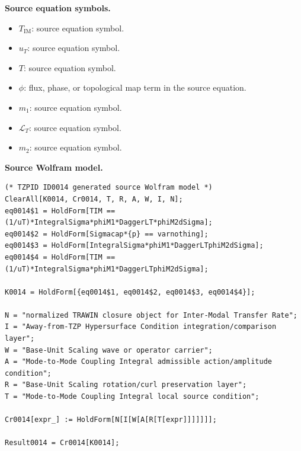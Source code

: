 \begin{minipage}[t]{0.49\linewidth}
\begingroup
\small
\raggedright
\textbf{Source equation symbols.}\par
\begin{itemize}[leftmargin=1.35em,itemsep=1pt,topsep=1pt,parsep=0pt]
    \item $T_{\mathrm{IM}}$: source equation symbol.
    \item $u_{T}$: source equation symbol.
    \item $T$: source equation symbol.
    \item $\phi$: flux, phase, or topological map term in the source equation.
    \item $m_{1}$: source equation symbol.
    \item $\mathcal{L}_{T}$: source equation symbol.
    \item $m_{2}$: source equation symbol.
\end{itemize}
\endgroup
\end{minipage}\hfill
\begin{minipage}[t]{0.47\linewidth}
\begingroup
\scriptsize
\raggedright
\textbf{Source Wolfram model.}\par
\begin{Verbatim}[fontsize=\tiny,breaklines=true,breakanywhere=true]
(* TZPID ID0014 generated source Wolfram model *)
ClearAll[K0014, Cr0014, T, R, A, W, I, N];
eq0014$1 = HoldForm[TIM == (1/uT)*IntegralSigma*phiM1*DaggerLT*phiM2dSigma];
eq0014$2 = HoldForm[Sigmacap*{p} == varnothing];
eq0014$3 = HoldForm[IntegralSigma*phiM1*DaggerLTphiM2dSigma];
eq0014$4 = HoldForm[TIM == (1/uT)*IntegralSigma*phiM1*DaggerLTphiM2dSigma];

K0014 = HoldForm[{eq0014$1, eq0014$2, eq0014$3, eq0014$4}];

N = "normalized TRAWIN closure object for Inter-Modal Transfer Rate";
I = "Away-from-TZP Hypersurface Condition integration/comparison layer";
W = "Base-Unit Scaling wave or operator carrier";
A = "Mode-to-Mode Coupling Integral admissible action/amplitude condition";
R = "Base-Unit Scaling rotation/curl preservation layer";
T = "Mode-to-Mode Coupling Integral local source condition";

Cr0014[expr_] := HoldForm[N[I[W[A[R[T[expr]]]]]]];

Result0014 = Cr0014[K0014];
\end{Verbatim}
\endgroup
\end{minipage}

